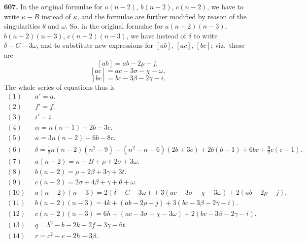 \documentclass[11pt,a4paper]{article}
\newcommand{\artno}[1]{\textbf{#1.}\quad}
\begin{document}
\medskip

\artno{607} In the original formulae for $a(n-2)$, $b(n-2)$, $c(n-2)$, we
have to write $\kappa - B$ instead of $\kappa$, and the formulae are further
modified by reason of the singularities $\theta$ and $\omega$.  So, in the
original formulae for $a(n-2)(n-3)$, $b(n-2)(n-3)$, $c(n-2)(n-3)$, we have
instead of $\delta$ to write $\delta - C - 3\omega$, and to substitute new
expressions for $[ab]$, $[ac]$, $[bc]$; viz.\ these are
\[
  [ab] = ab - 2\rho - j,
\]
\[
  [ac] = ac - 3\sigma - \chi - \omega,
\]
\[
  [bc] = bc - 3\beta - 2\gamma - i.
\]
The whole series of equations thus is
\begin{align*}
  (1)\;\; & a' = a. \\
  (2)\;\; & f' = f. \\
  (3)\;\; & i' = i. \\
  (4)\;\; & \alpha = n(n-1) - 2b - 3c. \\
  (5)\;\; & \kappa = 3n(n-2) - 6b - 8c. \\
  (6)\;\; & \delta = \tfrac{1}{2} n(n-2)(n^{2}-9)
           - (n^{2}-n-6)(2b+3c) + 2b(b-1) + 6bc + \tfrac{9}{2} c(c-1). \\
  (7)\;\; & a(n-2) = \kappa - B + \rho + 2\sigma + 3\omega. \\
  (8)\;\; & b(n-2) = \rho + 2\beta + 3\gamma + 3t. \\
  (9)\;\; & c(n-2) = 2\sigma + 4\beta + \gamma + \theta + \omega. \\
  (10)\;\; & a(n-2)(n-3) = 2(\delta - C - 3\omega)
                     + 3(ac - 3\sigma - \chi - 3\omega)
                     + 2(ab - 2\rho - j). \\
  (11)\;\; & b(n-2)(n-3) = 4k + (ab - 2\rho - j)
                     + 3(bc - 3\beta - 2\gamma - i). \\
  (12)\;\; & c(n-2)(n-3) = 6h + (ac - 3\sigma - \chi - 3\omega)
                     + 2(bc - 3\beta - 2\gamma - i). \\
  (13)\;\; & q = b^{2} - b - 2k - 2f - 3\gamma - 6t. \\
  (14)\;\; & r = c^{2} - c - 2h - 3\beta.
\end{align*}
\end{document}
